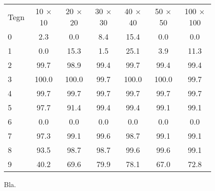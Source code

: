 \begin{figure}[htp]
\centering
\begin{tabular}{|l|c|c|c|c|c|c|}\hline
\rowcolor[gray]{0.9} \multicolumn{7}{|>{\columncolor[gray]{0.9}}c|}{\textbf{Forenings-billeder}} \\ \hline
Tegn & 10 $\times$ 10 & 20 $\times$ 20 & 30 $\times$ 30 & 40 $\times$ 40 & 50 $\times$ 50 & 100 $\times$ 100\\\hline
0 & 2.3 & 0.0 & 8.4 & 15.4 & 0.0 & 0.0\\\hline
1 & 0.0 & 15.3 & 1.5 & 25.1 & 3.9 & 11.3\\\hline
2 & 99.7 & 98.9 & 99.4 & 99.7 & 99.4 & 99.4\\\hline
3 & 100.0 & 100.0 & 99.7 & 100.0 & 100.0 & 99.7\\\hline
4 & 99.7 & 99.7 & 99.7 & 99.7 & 99.7 & 99.7\\\hline
5 & 97.7 & 91.4 & 99.4 & 99.4 & 99.1 & 99.1\\\hline
6 & 0.0 & 0.0 & 0.0 & 0.0 & 0.0 & 0.0\\\hline
7 & 97.3 & 99.1 & 99.6 & 98.7 & 99.1 & 99.1\\\hline
8 & 93.5 & 98.7 & 98.7 & 99.6 & 99.6 & 99.1\\\hline
9 & 40.2 & 69.6 & 79.9 & 78.1 & 67.0 & 72.8\\\hline
\end{tabular}
\caption{Bla.}
\label{fig:test:and_tal}
\end{figure}

